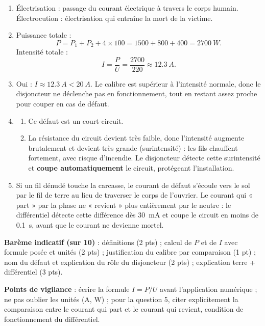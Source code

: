 \documentclass[11pt]{article}
\newcommand{\cle}[1]{{\popxbold\color{popdark}#1}}
\begin{document}
\begin{corrige}
\begin{enumerate}
\item \cle{Électrisation} : passage du courant électrique à travers le corps humain. \cle{Électrocution} : électrisation qui entraîne la mort de la victime.
\item Puissance totale :
\[ P = P_1 + P_2 + 4 \times 100 = 1500 + 800 + 400 = \SI{2700}{W}. \]
Intensité totale :
\[ I = \frac{P}{U} = \frac{2700}{220} \approx \SI{12,3}{A}. \]
\item Oui : $I \approx \SI{12,3}{A} < \SI{20}{A}$. Le calibre est supérieur à l'intensité normale, donc le disjoncteur ne déclenche pas en fonctionnement, tout en restant assez proche pour couper en cas de défaut.
\item \begin{enumerate}
\item Ce défaut est un \cle{court-circuit}.
\item La résistance du circuit devient très faible, donc l'intensité augmente brutalement et devient très grande (surintensité) : les fils chauffent fortement, avec risque d'incendie. Le disjoncteur détecte cette surintensité et \textbf{coupe automatiquement} le circuit, protégeant l'installation.
\end{enumerate}
\item Si un fil dénudé touche la carcasse, le courant de défaut s'écoule vers le sol par le fil de terre au lieu de traverser le corps de l'ouvrier. Le courant qui « part » par la phase ne « revient » plus entièrement par le neutre : le différentiel détecte cette différence dès \SI{30}{mA} et coupe le circuit en moins de \SI{0,1}{s}, avant que le courant ne devienne mortel.
\end{enumerate}
\textbf{Barème indicatif (sur 10)} : définitions (2 pts) ; calcul de $P$ et de $I$ avec formule posée et unités (2 pts) ; justification du calibre par comparaison (1 pt) ; nom du défaut et explication du rôle du disjoncteur (2 pts) ; explication terre + différentiel (3 pts).\par
\textbf{Points de vigilance} : écrire la formule $I = P/U$ avant l'application numérique ; ne pas oublier les unités (\si{A}, \si{W}) ; pour la question 5, citer explicitement la comparaison entre le courant qui part et le courant qui revient, condition de fonctionnement du différentiel.
\end{corrige}
\end{document}
